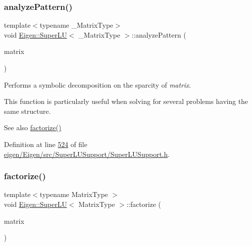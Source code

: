 \mbox{\label{class_eigen_1_1_super_l_u_a493cdfada27415a6037b004ff974eace}} 
\subsubsection{\texorpdfstring{analyze\+Pattern()}{analyzePattern()}\hspace{0.1cm}{\footnotesize\ttfamily [2/2]}}
{\footnotesize\ttfamily template$<$typename \+\_\+\+Matrix\+Type$>$ \\
void \hyperlink{class_eigen_1_1_super_l_u}{Eigen\+::\+Super\+LU}$<$ \+\_\+\+Matrix\+Type $>$\+::analyze\+Pattern (\begin{DoxyParamCaption}\item[{const Matrix\+Type \&}]{matrix }\end{DoxyParamCaption})\hspace{0.3cm}{\ttfamily [inline]}}

Performs a symbolic decomposition on the sparcity of {\itshape matrix}.

This function is particularly useful when solving for several problems having the same structure.

\begin{DoxySeeAlso}{See also}
\hyperlink{class_eigen_1_1_super_l_u_a0b5a5fbda1a1f368003c7c01021a4636}{factorize()} 
\end{DoxySeeAlso}


Definition at line \hyperlink{eigen_2_eigen_2src_2_super_l_u_support_2_super_l_u_support_8h_source_l00524}{524} of file \hyperlink{eigen_2_eigen_2src_2_super_l_u_support_2_super_l_u_support_8h_source}{eigen/\+Eigen/src/\+Super\+L\+U\+Support/\+Super\+L\+U\+Support.\+h}.

\mbox{\label{class_eigen_1_1_super_l_u_a0b5a5fbda1a1f368003c7c01021a4636}} 
\subsubsection{\texorpdfstring{factorize()}{factorize()}\hspace{0.1cm}{\footnotesize\ttfamily [1/2]}}
{\footnotesize\ttfamily template$<$typename Matrix\+Type $>$ \\
void \hyperlink{class_eigen_1_1_super_l_u}{Eigen\+::\+Super\+LU}$<$ Matrix\+Type $>$\+::factorize (\begin{DoxyParamCaption}\item[{const Matrix\+Type \&}]{matrix }\end{DoxyParamCaption})}


